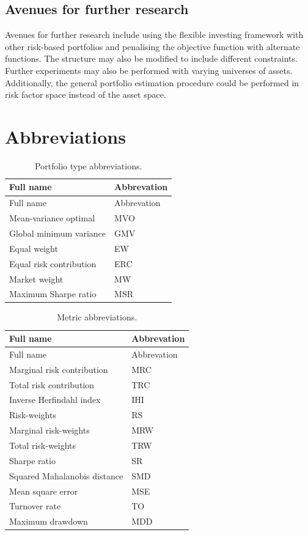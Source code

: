 \documentclass[
]{article}
\begin{document}
\hypertarget{avenues-for-further-research}{%
\subsection{Avenues for further research}\label{avenues-for-further-research}}

Avenues for further research include using the flexible investing framework with other risk-based
portfolios and penalising the objective function with alternate functions. The structure may also be
modified to include different constraints. Further experiments may also be performed with varying
universes of assets. Additionally, the general portfolio estimation procedure could be performed in
risk factor space instead of the asset space.

\hypertarget{appendix-appendix}{%
\appendix}


\hypertarget{abbreviations}{%
\section{Abbreviations}\label{abbreviations}}

\begin{longtable}[]{@{}ll@{}}
\caption{\label{tab:portabb} Portfolio type abbreviations.}\tabularnewline
\toprule
Full name & Abbrevation\tabularnewline
\midrule
\endfirsthead
\toprule
Full name & Abbrevation\tabularnewline
\midrule
\endhead
Mean-variance optimal & MVO\tabularnewline
Global minimum variance & GMV\tabularnewline
Equal weight & EW\tabularnewline
Equal risk contribution & ERC\tabularnewline
Market weight & MW\tabularnewline
Maximum Sharpe ratio & MSR\tabularnewline
\bottomrule
\end{longtable}

\begin{longtable}[]{@{}ll@{}}
\caption{\label{tab:metricabb} Metric abbreviations.}\tabularnewline
\toprule
Full name & Abbrevation\tabularnewline
\midrule
\endfirsthead
\toprule
Full name & Abbrevation\tabularnewline
\midrule
\endhead
Marginal risk contribution & MRC\tabularnewline
Total risk contribution & TRC\tabularnewline
Inverse Herfindahl index & IHI\tabularnewline
Risk-weights & RS\tabularnewline
Marginal risk-weights & MRW\tabularnewline
Total risk-weights & TRW\tabularnewline
Sharpe ratio & SR\tabularnewline
Squared Mahalanobis distance & SMD\tabularnewline
Mean square error & MSE\tabularnewline
Turnover rate & TO\tabularnewline
Maximum drawdown & MDD\tabularnewline
\bottomrule
\end{longtable}
\end{document}
